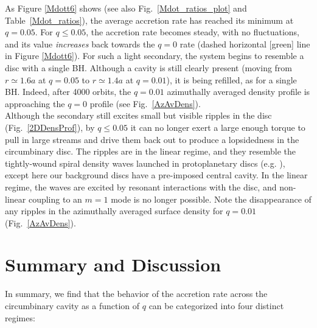 As Figure \ref{Mdott6} shows (see also Fig.~\ref{Mdot_ratios_plot} and
Table~\ref{Mdot_ratios}), the average accretion rate has reached its
minimum at $q=0.05$. For $q \leq 0.05$, the accretion rate
becomes steady, with no fluctuations, and its value {\em increases}
back towards the $q=0$ rate (dashed horizontal [green] line in Figure
\ref{Mdott6}).  For such a light secondary, the system
begins to resemble a disc with a single BH.  Although a cavity is
still clearly present (moving from $r\simeq1.6a$ at $q=0.05$ to
$r\simeq1.4a$ at $q=0.01$), it is being refilled, as for a single
BH. Indeed, after 4000 orbits, the $q=0.01$ azimuthally averaged density
profile is approaching the $q=0$ profile (see
Fig.~\ref{AzAvDens}). \\


Although the secondary still excites small but visible ripples in the
disc (Fig.~\ref{2DDensProf}), by $q\leq0.05$ it can no longer exert a
large enough torque to pull in large streams and drive them back out
to produce a lopsidedness in the circumbinary disc.  The ripples are 
in the linear regime, and they resemble the tightly-wound
spiral density waves launched in protoplanetary discs
(e.g. \citealt{GT80,DRS:2011:Linear,DM2012}), except here our
background discs have a pre-imposed central cavity.  In the 
linear regime, the waves are excited by resonant interactions with the
disc, and non-linear coupling to an $m=1$ mode is no longer
possible. Note the disappearance of any ripples in the azimuthally
averaged surface density for $q = 0.01$ (Fig.~\ref{AzAvDens}).



\section{Summary and Discussion}
\label{Summary and Discussion}
In summary, we find that the behavior of the accretion rate across the
circumbinary cavity as a function of $q$ can be categorized into four
distinct regimes:

